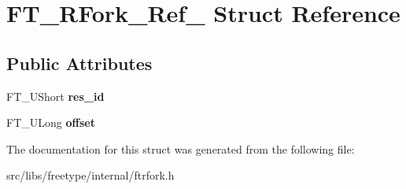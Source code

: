 \hypertarget{struct_f_t___r_fork___ref__}{
\section{FT\_\-RFork\_\-Ref\_\- Struct Reference}
\label{struct_f_t___r_fork___ref__}
}
\subsection*{Public Attributes}
\begin{DoxyCompactItemize}
\item 
\hypertarget{struct_f_t___r_fork___ref___a7bca14bddf56df7903166b52e19a0500}{
FT\_\-UShort {\bfseries res\_\-id}}
\label{struct_f_t___r_fork___ref___a7bca14bddf56df7903166b52e19a0500}

\item 
\hypertarget{struct_f_t___r_fork___ref___af84c349a29b40c42a788927b113f9ecf}{
FT\_\-ULong {\bfseries offset}}
\label{struct_f_t___r_fork___ref___af84c349a29b40c42a788927b113f9ecf}

\end{DoxyCompactItemize}


The documentation for this struct was generated from the following file:\begin{DoxyCompactItemize}
\item 
src/libs/freetype/internal/ftrfork.h\end{DoxyCompactItemize}
